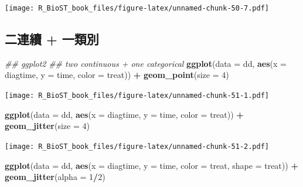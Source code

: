\documentclass[
]{book}
\newenvironment{Shaded}{\begin{snugshade}}{\end{snugshade}}
\newcommand{\CommentTok}[1]{\textcolor[rgb]{0.56,0.35,0.01}{\textit{#1}}}
\newcommand{\DataTypeTok}[1]{\textcolor[rgb]{0.13,0.29,0.53}{#1}}
\newcommand{\DecValTok}[1]{\textcolor[rgb]{0.00,0.00,0.81}{#1}}
\newcommand{\KeywordTok}[1]{\textcolor[rgb]{0.13,0.29,0.53}{\textbf{#1}}}
\newcommand{\NormalTok}[1]{#1}
\newcommand{\OperatorTok}[1]{\textcolor[rgb]{0.81,0.36,0.00}{\textbf{#1}}}
\newcommand{\StringTok}[1]{\textcolor[rgb]{0.31,0.60,0.02}{#1}}
\begin{document}
\texttt{[image: R\_BioST\_book\_files/figure-latex/unnamed-chunk-50-7.pdf]}

\hypertarget{ux4e8cux9023ux7e8c-ux4e00ux985eux5225}{%
\subsection{二連續 + 一類別}\label{ux4e8cux9023ux7e8c-ux4e00ux985eux5225}}

\begin{Shaded}
\begin{Highlighting}[]
\CommentTok{\#\# ggplot2}
\CommentTok{\#\# two continuous + one categorical}
\KeywordTok{ggplot}\NormalTok{(}\DataTypeTok{data =}\NormalTok{ dd, }\KeywordTok{aes}\NormalTok{(}\DataTypeTok{x =}\NormalTok{ diagtime, }\DataTypeTok{y =}\NormalTok{ time, }\DataTypeTok{color =}\NormalTok{ treat)) }\OperatorTok{+}\StringTok{ }
\StringTok{  }\KeywordTok{geom\_point}\NormalTok{(}\DataTypeTok{size =} \DecValTok{4}\NormalTok{)}
\end{Highlighting}
\end{Shaded}

\texttt{[image: R\_BioST\_book\_files/figure-latex/unnamed-chunk-51-1.pdf]}

\begin{Shaded}
\begin{Highlighting}[]
\KeywordTok{ggplot}\NormalTok{(}\DataTypeTok{data =}\NormalTok{ dd, }\KeywordTok{aes}\NormalTok{(}\DataTypeTok{x =}\NormalTok{ diagtime, }\DataTypeTok{y =}\NormalTok{ time, }\DataTypeTok{color =}\NormalTok{ treat)) }\OperatorTok{+}\StringTok{ }
\StringTok{  }\KeywordTok{geom\_jitter}\NormalTok{(}\DataTypeTok{size =} \DecValTok{4}\NormalTok{)}
\end{Highlighting}
\end{Shaded}

\texttt{[image: R\_BioST\_book\_files/figure-latex/unnamed-chunk-51-2.pdf]}

\begin{Shaded}
\begin{Highlighting}[]
\KeywordTok{ggplot}\NormalTok{(}\DataTypeTok{data =}\NormalTok{ dd, }\KeywordTok{aes}\NormalTok{(}\DataTypeTok{x =}\NormalTok{ diagtime, }\DataTypeTok{y =}\NormalTok{ time, }
                      \DataTypeTok{color =}\NormalTok{ treat, }\DataTypeTok{shape =}\NormalTok{ treat)) }\OperatorTok{+}\StringTok{ }
\StringTok{  }\KeywordTok{geom\_jitter}\NormalTok{(}\DataTypeTok{alpha =} \DecValTok{1}\OperatorTok{/}\DecValTok{2}\NormalTok{) }
\end{Highlighting}
\end{Shaded}
\end{document}
